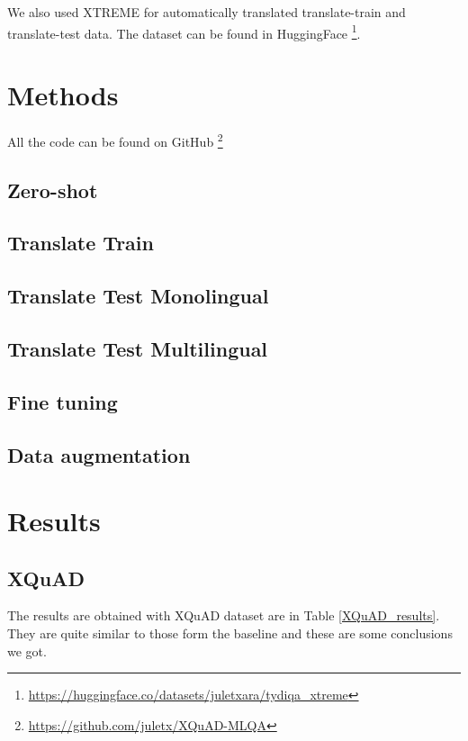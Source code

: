 \documentclass[11pt]{article}
\begin{document}
We also used XTREME \cite{XTREME} for automatically translated translate-train and translate-test data. The dataset can be found in HuggingFace \footnote{\url{https://huggingface.co/datasets/juletxara/tydiqa_xtreme}}.

\section{Methods}

All the code can be found on GitHub \footnote{\url{https://github.com/juletx/XQuAD-MLQA}}

\subsection{Zero-shot}


\subsection{Translate Train}

\subsection{Translate Test Monolingual}

\subsection{Translate Test Multilingual}

\subsection{Fine tuning}

\subsection{Data augmentation}

\section{Results}

\subsection{XQuAD}

The results are obtained with XQuAD dataset are in Table \ref{XQuAD_results}. They are quite similar to those form the baseline and these are some conclusions we got.
\end{document}

